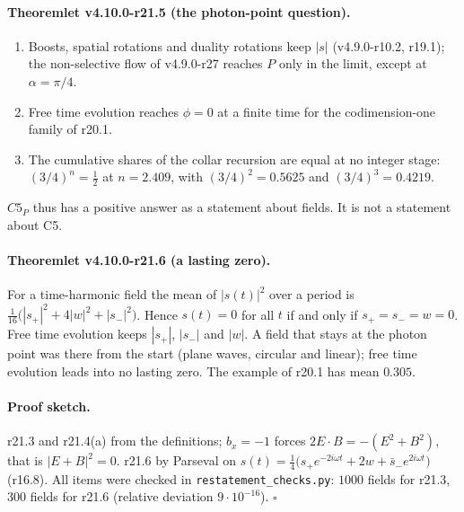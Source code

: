 \paragraph{Theoremlet v4.10.0-r21.5 (the photon-point question).}
\begin{enumerate}[leftmargin=2em]
\item[(a)] Boosts, spatial rotations and duality rotations keep \(|s|\) (v4.9.0-r10.2, r19.1); the non-selective flow of v4.9.0-r27 reaches
\(P\) only in the limit, except at \(\alpha=\pi/4\).
\item[(b)] Free time evolution reaches \(\phi=0\) at a finite time for the codimension-one family of r20.1.
\item[(c)] The cumulative shares of the collar recursion are equal at no integer stage: \((3/4)^n=\tfrac12\) at \(n=2.409\), with
\((3/4)^2=0.5625\) and \((3/4)^3=0.4219\).
\end{enumerate}
\(C5_P\) thus has a positive answer as a statement about fields.  It is not a statement about C5.

\paragraph{Theoremlet v4.10.0-r21.6 (a lasting zero).}
For a time-harmonic field the mean of \(|s(t)|^2\) over a period is \(\tfrac1{16}\bigl(|s_+|^2+4|w|^2+|s_-|^2\bigr)\).  Hence \(s(t)=0\) for all \(t\)
if and only if \(s_+=s_-=w=0\).  Free time evolution keeps \(|s_+|\), \(|s_-|\) and \(|w|\).  A field that stays at the photon point was there
from the start (plane waves, circular and linear); free time evolution leads into no lasting zero.  The example of r20.1 has mean
\(0.305\).

\paragraph{Proof sketch.}
r21.3 and r21.4(a) from the definitions; \(b_x=-1\) forces \(2E\cdot B=-(E^2+B^2)\), that is \(|E+B|^2=0\).  r21.6 by Parseval on
\(s(t)=\tfrac14\bigl(s_+e^{-2i\omega t}+2w+\bar s_-e^{2i\omega t}\bigr)\) (r16.8).  All items were checked in
\texttt{restatement\_\allowbreak checks.py}: \(1000\) fields for r21.3, \(300\) fields for r21.6 (relative deviation \(9\cdot10^{-16}\)).  \(\square\)

